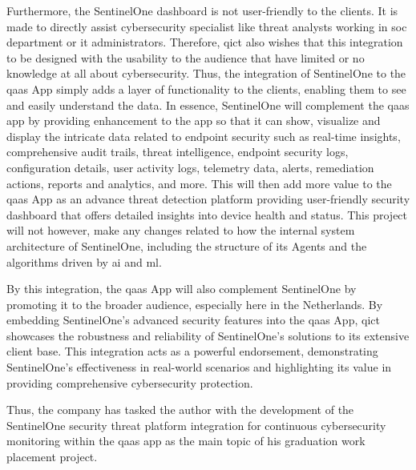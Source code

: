 Furthermore, the SentinelOne dashboard is not user-friendly to the clients. It is made to directly assist cybersecurity
specialist like threat analysts working in \acrshort{soc} department or \acrshort{it} administrators. Therefore,
\acrshort{qict} also wishes that this integration to be designed with the usability to the audience that have
limited or no knowledge at all about cybersecurity. Thus, the integration of SentinelOne to the
\acrshort{qaas} App simply adds a layer of functionality to the clients, enabling them to see and easily
understand the data. In essence, SentinelOne will complement the \acrshort{qaas} app by providing enhancement to the
app so that it can show, visualize and display the intricate data related to endpoint security such as real-time insights,
comprehensive audit trails, threat intelligence, endpoint security logs, configuration details, user activity logs, telemetry data,
alerts, remediation actions, reports and analytics, and more. This will then add more value to the \acrshort{qaas} App as an advance
threat detection platform providing user-friendly security dashboard that offers detailed insights into device health and status. This
project will not however, make any changes related to how the internal system architecture of SentinelOne, including the structure of
its Agents and the algorithms driven by \acrshort{ai} and \acrshort{ml}.

By this integration, the \acrshort{qaas} App will also complement SentinelOne by promoting it to the broader audience, especially here
in the Netherlands. By embedding SentinelOne's advanced security features into the \acrshort{qaas} App, \acrshort{qict} showcases the
robustness and reliability of SentinelOne's solutions to its extensive client base. This integration acts as a powerful endorsement,
demonstrating SentinelOne's effectiveness in real-world scenarios and highlighting its value in providing comprehensive cybersecurity
protection.

Thus, the company has tasked the author with the development of the SentinelOne security threat platform
integration for continuous cybersecurity monitoring within the \acrshort{qaas} app as the main topic of his
graduation work  placement project.

